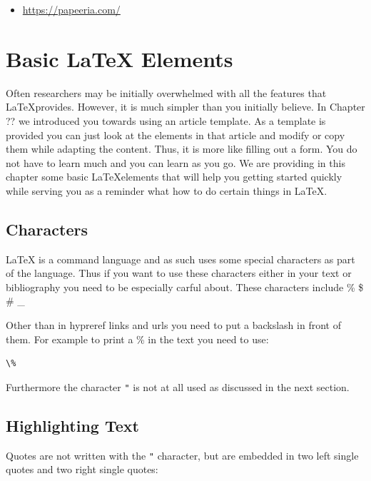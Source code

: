 \begin{itemize}

\item
  \url{https://papeeria.com/}
\end{itemize}


\section{Basic LaTeX Elements}\label{latex}

Often researchers may be initially overwhelmed with all the features
that \LaTeX provides. However, it is much simpler than you initially
believe. In Chapter ?? we introduced you towards using an article
template. As a template is provided you can just look at the elements
in that article and modify or copy them while adapting the
content. Thus, it is more like filling out a form. You do not have to
learn much and you can learn as you go. We are providing in this
chapter some basic \LaTeX elements that will help you getting started
quickly while serving you as a reminder what how to do certain things
in \LaTeX.



\subsection{Characters}\label{characters}

LaTeX is a command language and as such uses some special characters as
part of the language. Thus if you want to use these characters either in
your text or bibliography you need to be especially carful about. These
characters include \% \$ \# \_

Other than in hypreref links and urls you need to put a backslash in
front of them. For example to print a \% in the text you need to use:

\begin{verbatim}
\%
\end{verbatim}

Furthermore the character \verb|"| is not at all used as discussed in the next
section.

\subsection{Highlighting Text}\label{highlighting-text}

Quotes are not written with the \verb|"| character, but are embedded in two
left single quotes and two right single quotes:



